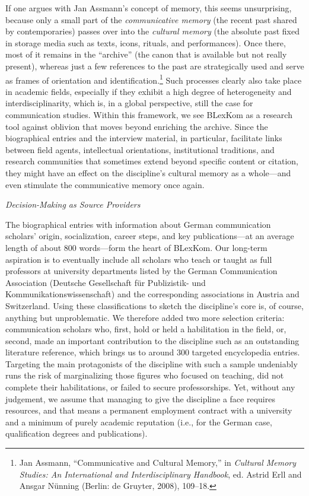 \documentclass{tufte-handout}
\begin{document}
If one argues with Jan Assmann's concept of memory, this seems
unsurprising, because only a small part of the \emph{communicative
memory} (the recent past shared by contemporaries) passes over into the
\emph{cultural memory} (the absolute past fixed in storage media such as
texts, icons, rituals, and performances). Once there, most of it remains
in the ``archive'' (the canon that is available but not really present),
whereas just a few references to the past are strategically used and
serve as frames of orientation and
identification.\footnote{Jan Assmann, ``Communicative and Cultural Memory,'' in \emph{Cultural
  Memory Studies: An International and Interdisciplinary Handbook}, ed.
  Astrid Erll and Ansgar Nünning (Berlin: de Gruyter, 2008), 109--18.
} Such processes
clearly also take place in academic fields, especially if they exhibit a
high degree of heterogeneity and interdisciplinarity, which is, in a
global perspective, still the case for communication studies. Within
this framework, we see BLexKom as a research tool against oblivion that
moves beyond enriching the archive. Since the biographical entries and
the interview material, in particular, facilitate links between field
agents, intellectual orientations, institutional traditions, and
research communities that sometimes extend beyond specific content or
citation, they might have an effect on the discipline's cultural memory
as a whole---and even stimulate the communicative memory once again.

\emph{Decision-Making as Source Providers}

The biographical entries with information about German communication
scholars' origin, socialization, career steps, and key publications---at
an average length of about 800 words---form the heart of BLexKom. Our
long-term aspiration is to eventually include all scholars who teach or
taught as full professors at university departments listed by the German
Communication Association (Deutsche Gesellschaft für Publizistik- und
Kommunikationswissenschaft) and the corresponding associations in
Austria and Switzerland. Using these classifications to sketch the
discipline's core is, of course, anything but unproblematic. We
therefore added two more selection criteria: communication scholars who,
first, hold or held a habilitation in the field, or, second, made an
important contribution to the discipline such as an outstanding
literature reference, which brings us to around 300 targeted
encyclopedia entries. Targeting the main protagonists of the discipline
with such a sample undeniably runs the risk of marginalizing those
figures who focused on teaching, did not complete their habilitations,
or failed to secure professorships. Yet, without any judgement, we
assume that managing to give the discipline a face requires resources,
and that means a permanent employment contract with a university and a
minimum of purely academic reputation (i.e., for the German case,
qualification degrees and publications).
\end{document}
